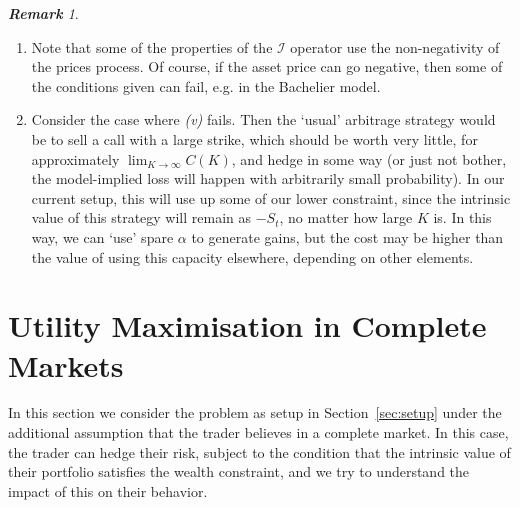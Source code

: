 \documentclass[a4paper]{amsart}
\newtheorem{question}[theorem]{Question}
\theoremstyle{definition}
\theoremstyle{remark}
\newtheorem{remark}[theorem]{\textbf{Remark}}
\numberwithin{equation}{section}
\newcommand{\comment}[1]{{\color{red} \bf #1}}
\newcommand{\In}{\mathcal{I}} %
\begin{document}
\begin{remark}
 \begin{enumerate}
 \item  Note that some of the properties of the $\In$ operator use the non-negativity of the prices process. Of course, if the asset price can go negative, then some of the conditions given can fail, e.g. in the Bachelier model.
 \item 
  Consider the case where \emph{(v)} fails. Then the `usual' arbitrage strategy would be to sell a call with a large strike, which should be worth very little, for approximately $\lim_{K \to \infty} C(K)$, and hedge in some way (or just not bother, the model-implied loss will happen with arbitrarily small probability). In our current setup, this will use up some of our lower constraint, since the intrinsic value of this strategy will remain as $-S_t$, no matter how large $K$ is. In this way, we can `use' spare $\alpha$ to generate gains, but the cost may be higher than the value of using this capacity elsewhere, depending on other elements. 
  \end{enumerate}
 \end{remark} 
  




\section{Utility Maximisation in Complete Markets}

In this section we consider the problem as setup in Section~\ref{sec:setup} under the additional assumption that the trader believes in a complete market. In this case, the trader can hedge their risk, subject to the condition that the intrinsic value of their portfolio satisfies the wealth constraint, and we try to understand the impact of this on their behavior.

\end{document}
